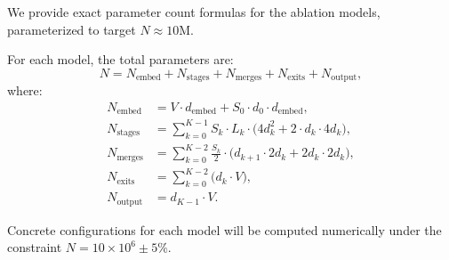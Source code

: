 \documentclass[11pt,a4paper]{article}
\theoremstyle{definition}
\theoremstyle{plain}
\theoremstyle{remark}
\begin{document}
We provide exact parameter count formulas for the ablation models, 
parameterized to target $N \approx 10$M.

For each model, the total parameters are:
\[
  N = N_{\text{embed}} + N_{\text{stages}} + N_{\text{merges}} + 
  N_{\text{exits}} + N_{\text{output}},
\]
where:
\begin{align}
  N_{\text{embed}} &= V \cdot d_{\text{embed}} + S_0 \cdot d_0 \cdot 
    d_{\text{embed}}, \\
  N_{\text{stages}} &= \sum_{k=0}^{K-1} S_k \cdot L_k \cdot 
    \bigl(4 d_k^2 + 2 \cdot d_k \cdot 4d_k\bigr), \\
  N_{\text{merges}} &= \sum_{k=0}^{K-2} \frac{S_k}{2} \cdot 
    \bigl(d_{k+1} \cdot 2d_k + 2d_k \cdot 2d_k\bigr), \\
  N_{\text{exits}} &= \sum_{k=0}^{K-2} \bigl(d_k \cdot V\bigr), \\
  N_{\text{output}} &= d_{K-1} \cdot V.
\end{align}

Concrete configurations for each model will be computed numerically under 
the constraint $N = 10 \times 10^6 \pm 5\%$.
\end{document}
